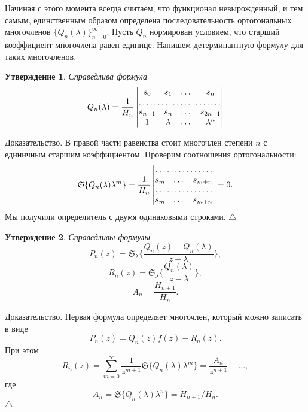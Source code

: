 \documentclass[12pt,a4paper]{article}
\theoremstyle{plain}   \newtheorem{Pro}{Задача}
\newtheorem{Sta}{Утверждение}
\begin{document}
Начиная с этого момента всегда считаем, что функционал
невырожденный, и тем самым, единственным образом
определена последовательность ортогональных многочленов
$ \{ Q_n (\lambda ) \} _{n=0}^{\infty}. $
Пусть
$  Q_n $
нормирован условием, что старший коэффициент многочлена равен
единице. Напишем детерминантную формулу для таких многочленов.
\begin{Sta}
Справедлива формула
\begin{equation*}
   Q_n (\lambda )=
  \frac{1}{H_n }
    \begin{vmatrix}
	  s_0 & s_1 & \dots & s_n \\
	  \hdotsfor{4}\\
	  s_{n-1} & s_n & \dots & s_{2n-1}\\
	  1 & \lambda & \dots & \lambda ^n
	\end{vmatrix}
\end{equation*}
\end{Sta}
{\Large Доказательство.}
В правой части равенства стоит многочлен степени
$ n $
с единичным старшим коэффициентом. Проверим соотношения ортогональности:
\begin{equation*}
  \mathfrak{S} \{  Q_n (\lambda ) \lambda ^m \} =
  \frac{1}{H_n }
    \begin{vmatrix}
	  \hdotsfor{3}\\
	  s_m & \dots & s_{m+n}\\
	  \hdotsfor{3}\\
	  s_m & \dots & s_{m+n}
	\end{vmatrix}
  =0.
\end{equation*}
Мы получили определитель с двумя одинаковыми строками.
$ \triangle $
\begin{Sta}
Справедливы формулы
$$
   P_n (z) =
  \mathfrak{S}_{\lambda }
  \biggl \{
  \frac{ Q_n (z) -  Q_n (\lambda )}
  {z-\lambda}
  \biggr \} ,
$$
$$
   R_n (z) =
  \mathfrak{S}_{\lambda}
  \biggl \{
  \frac{ Q_n (\lambda )}
  {z-\lambda}
  \biggr \} ,
$$
$$
   A_n =
  \frac{H_{n+1}}{H_n }.
$$
\end{Sta}
{\Large Доказательство.}
Первая формула определяет многочлен, который можно записать
в виде
$$
   P_n (z)=
   Q_n (z)f(z)-  R_n (z).
$$
При этом
$$
   R_n (z)=
  \sum _{m=0}^{\infty}
  \frac{1}{z^{m+1}}
  \mathfrak{S} \{  Q_n (\lambda ) \lambda ^m \}
  =\frac{ A_n }{z^{n+1}}+...,
$$
где
$$
   A_n =
  \mathfrak{S} \{  Q_n (\lambda ) \lambda ^n \}=
  H_{n+1}/H_n .
$$
$ \triangle $
\newpage
\end{document}
